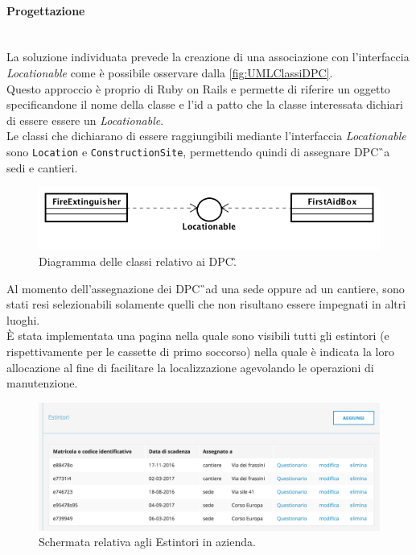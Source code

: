 \paragraph*{Progettazione}\mbox{}\\
La soluzione individuata prevede la creazione di una associazione con l'interfaccia \textit{Locationable} come è possibile osservare dalla \autoref{fig:UMLClassiDPC}.\\
Questo approccio è proprio di Ruby on Rails e permette di riferire un oggetto specificandone il nome della classe e l'id a patto che la classe interessata dichiari di essere essere un \textit{Locationable}.\\
Le classi che dichiarano di essere raggiungibili mediante l'interfaccia \textit{Locationable} sono \texttt{Location} e \texttt{ConstructionSite}, permettendo quindi di assegnare \gls{DPC}\G\ a sedi e cantieri.
\begin{figure}[H]
	\begin{center}
		\includegraphics[width=12cm]{Pics/UMLClassiDPC.png}
		\caption{Diagramma delle classi relativo ai \gls{DPC}\G.}
		\label{fig:UMLClassiDPC}
	\end{center}
\end{figure}

Al momento dell'assegnazione dei \gls{DPC}\G\ ad una sede oppure ad un cantiere, sono stati resi selezionabili solamente quelli che non risultano essere impegnati in altri luoghi.\\
È stata implementata una pagina nella quale sono visibili tutti gli estintori (e rispettivamente per le cassette di primo soccorso) nella quale è indicata la loro allocazione al fine di facilitare la localizzazione agevolando le operazioni di manutenzione.

\begin{figure}[H]
	\begin{center}
		\includegraphics[width=15cm]{Pics/ScreenIndexEstintori.png}
		\caption{Schermata relativa agli Estintori in azienda.}
		\label{fig:ScreenIndexEstintori}
	\end{center}
\end{figure}




